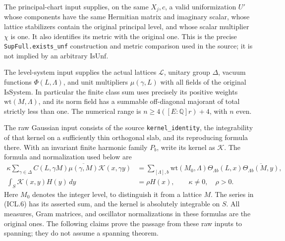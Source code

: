 The principal-chart input supplies, on the same \(X_j,c\),
a valid uniformization \(U'\) whose components have the
same Hermitian matrix and imaginary scalar, whose lattice
stabilizers contain the original principal level, and
whose scalar multiplier \(\chi\) is one.  It also identifies
its metric with the original one.  This is the precise
\texttt{SupFull.exists\_unf} construction and metric
comparison used in the source; it is not implied by an
arbitrary \(\mathrm{IsUnf}\).

The level-system input supplies the actual lattices
\(\mathcal L\), unitary group \(\Delta\), vacuum functions
\(\Phi(L,\Lambda)\), and unit multipliers \(\mu(\gamma,L)\)
with all fields of the original \(\mathrm{IsSystem}\).
In particular the finite class sum uses precisely its
positive weights \(\mathrm{wt}(M,\Lambda)\), and its norm
field has a summable off-diagonal majorant of total
strictly less than one.  The numerical range is
\(n\geq4([E:\mathbb Q]r)+4\), with \(n\) even.

The raw Gaussian input consists of the source
\texttt{kernel\_identity}, the integrability of that
kernel on a sufficiently thin orthogonal slab, and its
reproducing formula there.  With an invariant finite
harmonic family \(P_b\), write its kernel as \(\mathcal K\).
The formula and normalization used below are
\begin{align}
 \kappa\sum_{\gamma\in\Delta}
 C(L,\gamma M)\overline{\mu(\gamma,M)}
 \mathcal K(x,\gamma y)
 &=\sum_{[\Lambda],b}\mathrm{wt}(M_0,\Lambda)
       \Theta_{\Lambda b}(L,x)
       \overline{\Theta_{\Lambda b}(M,y)},             \tag{ICL.6}\\
 \int_S\mathcal K(x,y)H(y)\,dy&=\rho H(x),\qquad
                    \kappa\ne0,\quad\rho>0.          \tag{ICL.7}
\end{align}
Here \(M_0\) denotes the integer level, to distinguish it
from a lattice \(M\).  The series in (ICL.6) has its
asserted sum, and the kernel is absolutely integrable on
\(S\).  All measures, Gram matrices, and oscillator
normalizations in these formulas are the original ones.
The following claims prove the passage from these raw
inputs to spanning; they do not assume a spanning theorem.

